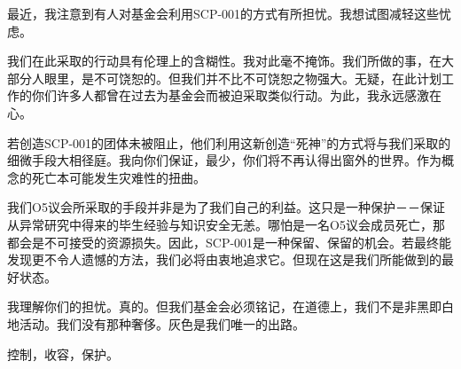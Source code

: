 \begin{scpbox}

\begin{center}


\end{center}

最近，我注意到有人对基金会利用SCP-001的方式有所担忧。我想试图减轻这些忧虑。

我们在此采取的行动具有伦理上的含糊性。我对此毫不掩饰。我们所做的事，在大部分人眼里，是不可饶恕的。但我们并不比不可饶恕之物强大。无疑，在此计划工作的你们许多人都曾在过去为基金会而被迫采取类似行动。为此，我永远感激在心。

若创造SCP-001的团体未被阻止，他们利用这新创造“死神”的方式将与我们采取的细微手段大相径庭。我向你们保证，最少，你们将不再认得出窗外的世界。作为概念的死亡本可能发生灾难性的扭曲。

我们O5议会所采取的手段并非是为了我们自己的利益。这只是一种保护－－保证从异常研究中得来的毕生经验与知识安全无恙。哪怕是一名O5议会成员死亡，那都会是不可接受的资源损失。因此，SCP-001是一种保留、保留的机会。若最终能发现更不令人遗憾的方法，我们必将由衷地追求它。但现在这是我们所能做到的最好状态。

我理解你们的担忧。真的。但我们基金会必须铭记，在道德上，我们不是非黑即白地活动。我们没有那种奢侈。灰色是我们唯一的出路。

控制，收容，保护。

\begin{center}



\end{center}

\end{scpbox}


\begin{scpbox}


\end{scpbox}


\begin{scpbox}


\end{scpbox}

